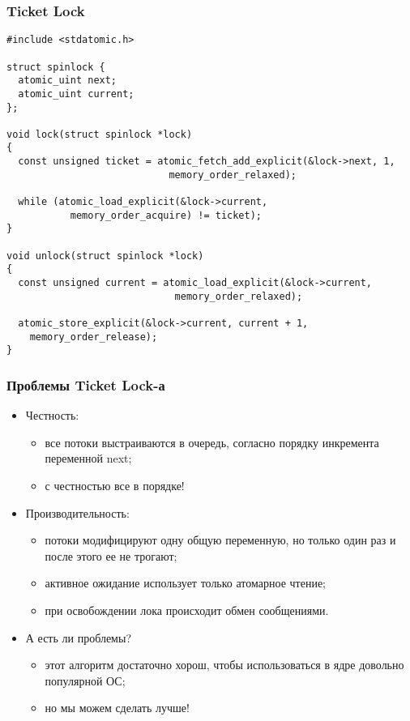 \begin{frame}[fragile]
\frametitle{Ticket Lock}
\begin{lstlisting}
#include <stdatomic.h>

struct spinlock {
  atomic_uint next;
  atomic_uint current;
};

void lock(struct spinlock *lock)
{
  const unsigned ticket = atomic_fetch_add_explicit(&lock->next, 1,
                            memory_order_relaxed);

  while (atomic_load_explicit(&lock->current,
           memory_order_acquire) != ticket);
}

void unlock(struct spinlock *lock)
{
  const unsigned current = atomic_load_explicit(&lock->current,
                             memory_order_relaxed);

  atomic_store_explicit(&lock->current, current + 1,
    memory_order_release);
}
\end{lstlisting}
\end{frame}

\begin{frame}
\frametitle{Проблемы Ticket Lock-а}
\begin{itemize}
  \item Честность:
  \begin{itemize}
    \item все потоки выстраиваются в очередь, согласно порядку инкремента
    переменной next;
    \item с честностью все в порядке!
  \end{itemize}
  \item Производительность:
  \begin{itemize}
    \item потоки модифицируют одну общую переменную, но только один раз и после
    этого ее не трогают;
    \item активное ожидание использует только атомарное чтение;
    \item при освобождении лока происходит обмен сообщениями.
  \end{itemize}
  \item А есть ли проблемы?
  \begin{itemize}
    \item этот алгоритм достаточно хорош, чтобы использоваться в ядре довольно
    популярной ОС;
    \item но мы можем сделать лучше!
  \end{itemize}
\end{itemize}
\end{frame}

